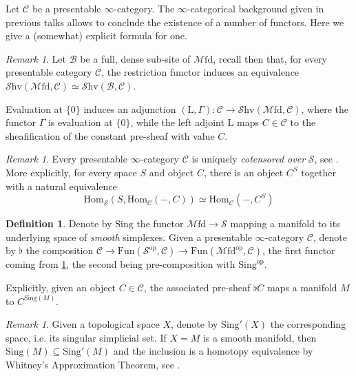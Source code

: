 \documentclass[10pt]{amsart}
\newcommand{\B}{\mathscr{B}}
\newcommand{\C}{\mathscr{C}}
\newcommand{\s}{\mathscr{S}}
\newcommand{\Hom}{\mathrm{Hom}}
\newcommand{\Fun}{\mathrm{Fun}}
\newcommand{\Mfd}{\mathscr{M}\mathrm{fd}}
\newcommand{\Shv}{\mathscr{S}\mathrm{hv}}
\newcommand{\Sing}{\mathrm{Sing}}
\newcommand{\const}{\mathrm{L}}
\newcommand{\op}{\mathrm{op}}
\theoremstyle{definition}
\newtheorem{definition}[equation]{Definition}
\theoremstyle{remark}
\newtheorem{remark}[equation]{Remark}
\numberwithin{equation}{section}
\begin{document}
Let $\C$ be a presentable $\infty$-category. The $\infty$-categorical background given in previous talks allows to conclude the existence of a number of functors. Here we give a (somewhat) explicit formula for one. 
\begin{remark}
  Let $\B$ be a full, dense sub-site of $\Mfd$, recall then that, for every presentable category $\C$, the restriction functor induces an equivalence $\Shv(\Mfd,\C)\simeq\Shv(\B,\C)$. 
\end{remark}
Evaluation at $\{0\}$ induces an adjunction $(\const,\Gamma):\C\to\Shv(\Mfd,\C)$, where the functor $\Gamma$ is evaluation at $\{0\}$, while the left adjoint $\const$ maps $C\in\C$ to the sheafification of the constant pre-sheaf with value $C$. 
\begin{remark}\label{rmk:cotensor}
Every presentable $\infty$-category $\C$ is uniquely \emph{cotensored over} $\s$, see \cite[Remark 5.5.2.6]{lurie2009htt}. More explicitly, for every space $S$ and object $C$, there is an object $C^S$ together with a natural equivalence $$\Hom_\s(S,\Hom_\C(-,C))\simeq\Hom_\C(-,C^S)$$
\end{remark}
\begin{definition}
  Denote by $\Sing$ the functor $\Mfd\to\s$ mapping a manifold to its underlying space of \emph{smooth} simplexes. Given a presentable $\infty$-category $\C$, denote by $\flat$ the composition $\C\to\Fun(\s^{\op},\C)\to\Fun(\Mfd^{\op},\C)$, the first functor coming from \cref{rmk:cotensor}, the second being pre-composition with $\Sing^{\op}$.
\end{definition}
Explicitly, given an object $C\in\C$, the associated pre-sheaf $\flat C$ maps a manifold $M$ to $C^{\Sing(M)}$.
\begin{remark}
  Given a topological space $X$, denote by $\Sing'(X)$ the corresponding space, i.e. its singular simplicial set. If $X=M$ is a smooth manifold, then $\Sing(M)\subseteq\Sing'(M)$ and the inclusion is a homotopy equivalence by Whitney's Approximation Theorem, see \cite[Theorem 1.6]{zuoqin2021whitney}. 
\end{remark}
\end{document}
